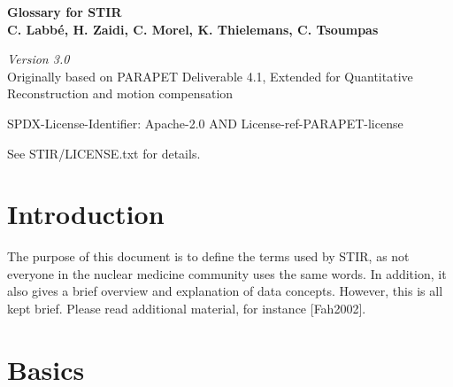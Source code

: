 \documentclass{article}
\begin{document}
\begin{center}
\textbf{{\huge Glossary for STIR}}\\
\textbf{C. Labb\'{e}, H. Zaidi, C. Morel, K. Thielemans, C. Tsoumpas}
\end{center}

\begin{center}
\textit{Version 3.0}\\
Originally based on PARAPET Deliverable 4.1,
Extended for Quantitative Reconstruction and motion compensation

\end{center}

SPDX-License-Identifier: Apache-2.0 AND License-ref-PARAPET-license

See STIR/LICENSE.txt for details.

\section*{Introduction}
The purpose of this document is to define the terms used by STIR, as not everyone in the nuclear 
medicine community uses the same words. In addition, it also gives a brief overview and explanation 
of data concepts. However, this is all kept brief. Please read additional material, for instance
[Fah2002].

\section*{Basics}
\end{document}
